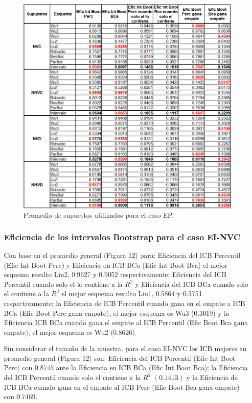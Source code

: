 \begin{figure}[ht] 
	\centering 
	\includegraphics[width=0.80\linewidth]{img/EP_Prom_Supuestos.png} 
	\caption{Promedio de supuestos utilizados para el caso EP.} 
	\label{fig:EP_Supuestos}
\end{figure}
\FloatBarrier



\subsubsection{Eficiencia de los intervalos Bootstrap para el caso EI-NVC}
Con base en el promedio general (Figura 12) para: Eficiencia del ICB Percentil (Efic Int Boot Perc) y Eficiencia en ICB BCa (Efic Int Boot Bca) el mejor esquema resulto Liu2, 0.9627 y 0.9052 respectivamente;
 Eficiencia del ICB Percentil cuando solo el lo contiene a la $R^{2}$ y Eficiencia del ICB BCa cuando solo el contiene a la $R^{2}$ el mejor esquema resulto Liu1, 0.5864 y 0.5751 respectivamente; 
 la Eficiencia de ICB Percentil cuando gana en el empate a ICB BCa (Efic Boot Perc gana empate), el mejor esquema es Wu3 (0.3019) y la Eficiencia ICB BCa cuando gana el empate al ICB Percentil (Efic Boot Bca gana empate), el mejor esquema es Wu2 (0.8626).
\vspace{.5cm}


Sin considerar el tamaño de la muestra, para el caso EI-NVC los ICB mejores en promedio general (Figura 12) son: Eficiencia del ICB Percentil (Efic Int Boot Perc) con $0.8745$ ante la Eficiencia en ICB BCa (Efic Int Boot Bca); la Eficiencia del ICB Percentil cuando solo el contiene a la $R^{2}$ $(0.1413)$ y la Eficiencia de ICB BCa cuando gana en el empate al ICB Perc (Efic Boot Bca gana empate) con $0.7469$.


